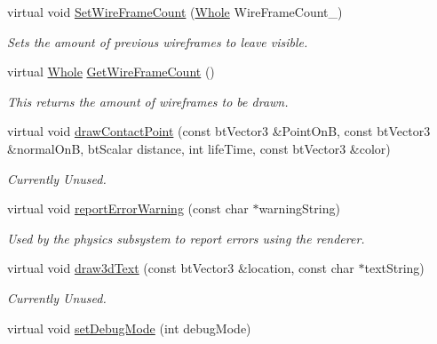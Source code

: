 \begin{DoxyCompactItemize}
virtual void \hyperlink{classphys_1_1debug_1_1InternalDebugDrawer_a76922fda7bb3b59d301e50d67e4f3c72}{SetWireFrameCount} (\hyperlink{namespacephys_a460f6bc24c8dd347b05e0366ae34f34a}{Whole} WireFrameCount\_\-)
\begin{DoxyCompactList}\small\item\em Sets the amount of previous wireframes to leave visible. \item\end{DoxyCompactList}\item 
virtual \hyperlink{namespacephys_a460f6bc24c8dd347b05e0366ae34f34a}{Whole} \hyperlink{classphys_1_1debug_1_1InternalDebugDrawer_aa1666e636e6ff81813c0b1a85d7bc157}{GetWireFrameCount} ()
\begin{DoxyCompactList}\small\item\em This returns the amount of wireframes to be drawn. \item\end{DoxyCompactList}\item 
virtual void \hyperlink{classphys_1_1debug_1_1InternalDebugDrawer_a8b912aaff8dfd9f4e97ffb2d867121b2}{drawContactPoint} (const btVector3 \&PointOnB, const btVector3 \&normalOnB, btScalar distance, int lifeTime, const btVector3 \&color)
\begin{DoxyCompactList}\small\item\em Currently Unused. \item\end{DoxyCompactList}\item 
virtual void \hyperlink{classphys_1_1debug_1_1InternalDebugDrawer_a4e3b4cbc861f76696b4d32f0cf068ea6}{reportErrorWarning} (const char $\ast$warningString)
\begin{DoxyCompactList}\small\item\em Used by the physics subsystem to report errors using the renderer. \item\end{DoxyCompactList}\item 
virtual void \hyperlink{classphys_1_1debug_1_1InternalDebugDrawer_a1266d3fad8868ade2d515e9c92e76b4a}{draw3dText} (const btVector3 \&location, const char $\ast$textString)
\begin{DoxyCompactList}\small\item\em Currently Unused. \item\end{DoxyCompactList}\item 
virtual void \hyperlink{classphys_1_1debug_1_1InternalDebugDrawer_a63059b273ed6031a393b2d994b820bcc}{setDebugMode} (int debugMode)

\end{DoxyCompactItemize}
